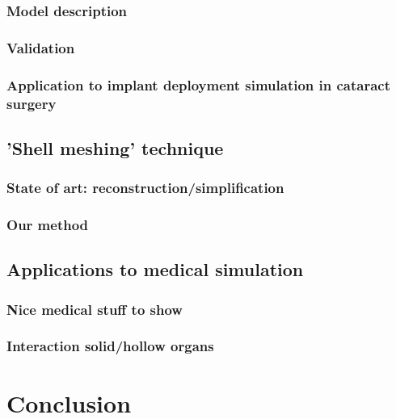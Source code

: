 		\section{Model description}
		\section{Validation}
		\section{Application to implant deployment simulation in cataract surgery}
	
	\chapter{'Shell meshing' technique }
		\section{State of art: reconstruction/simplification}
		\section{Our method}
		
	\chapter{Applications to medical simulation}
		\section{Nice medical stuff to show}
		\section{Interaction solid/hollow organs}
	
	
	
\part{Conclusion}